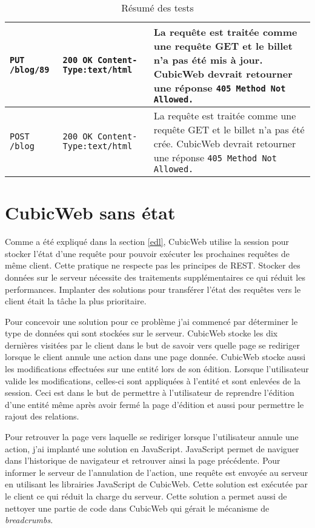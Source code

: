 \begin{table}[!h]
\begin{tabular}{|>{\raggedright\arraybackslash}m{}|m{}|m{}|}
\tt{\footnotesize PUT /blog/89} & \tt{\footnotesize 200 OK \newline
                Content-Type:text/html} & La requête est traitée comme une
                    requête GET et le billet n'a pas été mis à jour. CubicWeb
                    devrait retourner une réponse \tt{405~Method Not Allowed}.
                    \\ \hline 

\tt{\footnotesize POST /blog} & \tt{\footnotesize 200 OK \newline
                Content-Type:text/html} & La requête est traitée comme une
                    requête GET et le billet n'a pas été crée. CubicWeb devrait
                    retourner une réponse \tt{405~Method Not Allowed}.  \\
                \hline \end{tabular} \caption{Résumé des tests}
            \label{table:tests} \end{table}

\section{CubicWeb sans état} 
Comme a été expliqué dans la section \ref{edl}, CubicWeb utilise la session pour 
stocker l'état d'une requête pour pouvoir exécuter les prochaines requêtes de même 
client. Cette pratique ne respecte pas les principes de REST. Stocker des données 
sur le serveur nécessite des traitements supplémentaires ce qui réduit les 
performances. Implanter des solutions pour transférer l'état des requêtes vers le 
client était la tâche la plus prioritaire.

Pour concevoir une solution pour ce problème j'ai commencé par déterminer le
type de données qui sont stockées sur le serveur. CubicWeb stocke les dix
dernières  visitées par le client dans le but de savoir vers
quelle page se rediriger lorsque le client annule une action dans une page
donnée. CubicWeb stocke aussi les modifications effectuées sur une entité lors
de son édition. Lorsque l'utilisateur valide les modifications, celles-ci sont
appliquées à l'entité et sont enlevées de la session. Ceci est dans le but de
permettre à l'utilisateur de reprendre l'édition d'une entité même après avoir
fermé la page d'édition et aussi pour permettre le rajout des relations. 

Pour retrouver la page vers laquelle se rediriger lorsque l'utilisateur annule
une action, j'ai implanté une solution en JavaScript. JavaScript permet de
naviguer dans l'historique de navigateur et retrouver ainsi la page précédente.
Pour informer le serveur de l'annulation de l'action, une requête
 est envoyée au serveur en utilisant les librairies
JavaScript de CubicWeb. Cette solution est exécutée par le client ce qui réduit
la charge du serveur. Cette solution a permet aussi de nettoyer une partie de
code dans CubicWeb qui gérait le mécanisme de \textit{breadcrumbs}.

